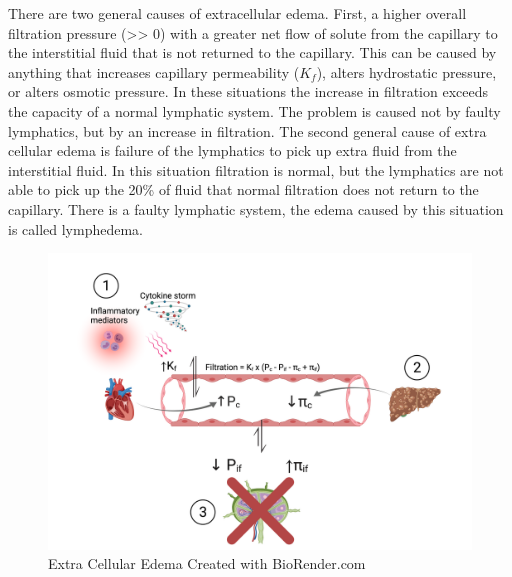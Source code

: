 There are two general causes of extracellular edema. First, a higher overall filtration pressure (>> 0) with a greater net flow of solute from the capillary to the interstitial fluid that is not returned to the capillary. This can be caused by anything that increases capillary permeability ($K_f$), alters hydrostatic pressure, or alters osmotic pressure. In these situations the increase in filtration exceeds the capacity of a normal lymphatic system. The problem is caused not by faulty lymphatics, but by an increase in filtration.
The second general cause of extra cellular edema is failure of the lymphatics to pick up extra fluid from the interstitial fluid. In this situation filtration is normal, but the lymphatics are not able to pick up the 20\% of fluid that normal filtration does not return to the capillary. There is a faulty lymphatic system, the edema caused by this situation is called lymphedema.

\begin{figure}[!h]
    \centering
    \includegraphics[width=1\linewidth]{./figure/Extracellular_Edema.png}
    \caption{Extra Cellular Edema \footnotesize{Created with BioRender.com}}
    \label{fig:Extracellular_Edema}
\end{figure}

